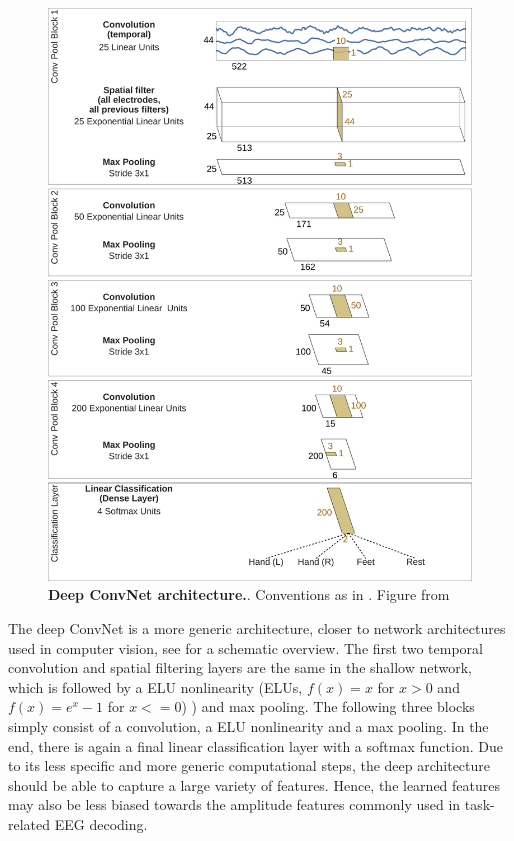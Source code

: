 \begin{figure}[ht]
    \myfloatalign
    \includegraphics[width=0.9\linewidth]{images/3D_Diagram_MatplotLib.ipynb.1.png}
    \caption[Deep ConvNet architecture]{
    \textbf{Deep ConvNet architecture.}. Conventions as in . Figure from \citep{schirrmeisterdeephbm2017}}\label{deep-net-figure}
\end{figure}


    The deep ConvNet is a more generic architecture, closer to network
architectures used in computer vision, see
 for a schematic overview. The first
two temporal convolution and spatial filtering layers are the same in
the shallow network, which is followed by a ELU nonlinearity (ELUs, $f(x)=x$ for $x > 0$ and $f(x) = e^x-1$ for $x <= 0$) \cite{clevert_fast_2016}) and max pooling. The following
three blocks simply consist of a convolution, a ELU nonlinearity and a
max pooling. In the end, there is again a final linear classification
layer with a softmax function. Due to its less specific and more generic
computational steps, the deep architecture should be able to capture a
large variety of features. Hence, the learned features may also be less
biased towards the amplitude features commonly used in task-related EEG
decoding.


